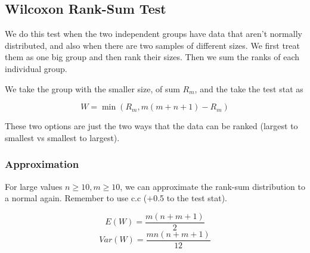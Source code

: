\documentclass{article}
\theoremstyle{mytheoremstyle}
\theoremstyle{mytheoremstyle}
\theoremstyle{myproblemstyle}
\begin{document}
    \subsection{Wilcoxon Rank-Sum Test}

    We do this test when the two independent groups have data that aren't normally distributed, and also when there are two samples of different sizes. We first treat them as one big group and then rank their sizes. Then we sum the ranks of each individual group. 

    We take the group with the smaller size, of sum $R_m$, and the take the test stat as

    \begin{definition}
        \[W = \min(R_m, m(m + n + 1) - R_m)\]
    \end{definition}

    These two options are just the two ways that the data can be ranked (largest to smallest vs smallest to largest).

    \subsubsection{Approximation}
    For large values $n \geq 10, m \geq 10$, we can approximate the rank-sum distribution to a normal again. Remember to use c.c (+0.5 to the test stat).

    \begin{theorem}

        \[E(W) = \frac{m(n+m+1)}{2}\]
        \[Var(W) = \frac{mn(n+m+1)}{12}\]
        
    \end{theorem}


    
\end{document}
